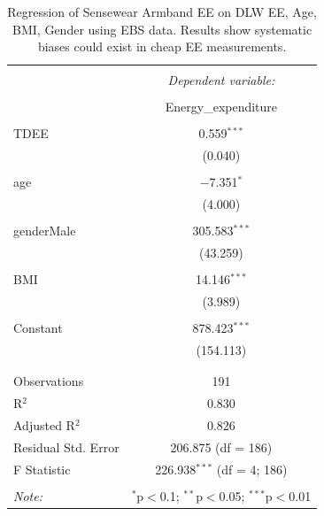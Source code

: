 \documentclass[11pt]{article}\usepackage[]{graphicx}\usepackage[]{color}
\begin{document}
\begin{table}[!htbp] \centering 
  \caption{Regression of Sensewear Armband EE on DLW EE, Age, BMI, Gender using EBS data. Results show systematic biases could exist in cheap EE measurements.} 
  \label{ebslm} 
\begin{tabular}{@{\extracolsep{5pt}}lc} 
\\[-1.8ex]\hline 
\hline \\[-1.8ex] 
 & \multicolumn{1}{c}{\textit{Dependent variable:}} \\ 
\cline{2-2} 
\\[-1.8ex] & Energy\_expenditure \\ 
\hline \\[-1.8ex] 
 TDEE & 0.559$^{***}$ \\ 
  & (0.040) \\ 
  & \\ 
 age & $-$7.351$^{*}$ \\ 
  & (4.000) \\ 
  & \\ 
 genderMale & 305.583$^{***}$ \\ 
  & (43.259) \\ 
  & \\ 
 BMI & 14.146$^{***}$ \\ 
  & (3.989) \\ 
  & \\ 
 Constant & 878.423$^{***}$ \\ 
  & (154.113) \\ 
  & \\ 
\hline \\[-1.8ex] 
Observations & 191 \\ 
R$^{2}$ & 0.830 \\ 
Adjusted R$^{2}$ & 0.826 \\ 
Residual Std. Error & 206.875 (df = 186) \\ 
F Statistic & 226.938$^{***}$ (df = 4; 186) \\ 
\hline 
\hline \\[-1.8ex] 
\textit{Note:}  & \multicolumn{1}{r}{$^{*}$p$<$0.1; $^{**}$p$<$0.05; $^{***}$p$<$0.01} \\ 
\end{tabular} 
\end{table} 
\end{document}
